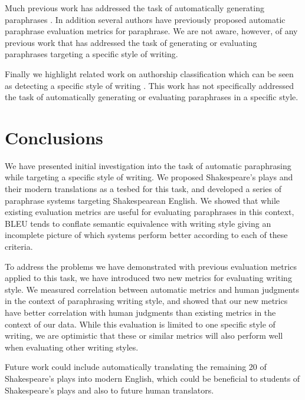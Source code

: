 \documentclass[10pt,a5paper,twoside]{article}
\begin{document}
Much previous work has addressed the task of automatically generating paraphrases \cite{Barzilay03,dolan04,Shinyama03,Das09,bannard05,Callison-Burch08,Kok10}.  In addition several authors have previously proposed 
automatic paraphrase evaluation metrics \cite{chen11,Callison-Burch08b,Bangalore00,liu10} for paraphrase.
We are not aware, however, of any previous work that has addressed the task of generating or evaluating
paraphrases targeting a specific style of writing.

Finally we highlight related work on authorship classification which can be seen as detecting a specific style of writing \cite{Gamon04,Raghavan10}.
This work has not specifically addressed the task of automatically generating or evaluating paraphrases in a specific style.

\section{Conclusions}
We have presented initial investigation into the task of automatic paraphrasing while targeting a specific style of writing.  We proposed Shakespeare's plays and their
modern translations as a tesbed for this task, and developed a series of paraphrase systems targeting Shakespearean English.  We showed that while existing evaluation
metrics are useful for evaluating paraphrases in this context, BLEU tends to conflate semantic equivalence with writing style giving an incomplete picture of which systems
perform better according to each of these criteria.  

To address the problems we have demonstrated with previous evaluation metrics applied to this task, we have introduced two new metrics for evaluating writing style.
We measured correlation between automatic metrics and human judgments in the context of paraphrasing writing style, and showed
that our new metrics have better correlation with human judgments than existing metrics in the context of our data.
While this evaluation is limited to one specific style of writing, we are optimistic that these or similar metrics will also perform well when
evaluating other writing styles.

Future work could include automatically translating the remaining 20 of Shakespeare's plays into modern English, which could be beneficial to students
of Shakespeare's plays and also to future human translators.





\end{document}
